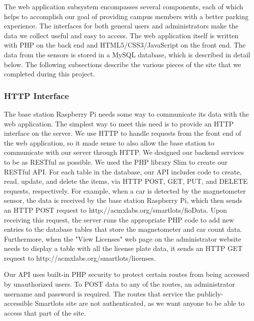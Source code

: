 \documentclass[11pt, oneside, fullpage, doublespace]{article}
\begin{document}
The web application subsystem encompasses several components, each of which helps to accomplish our goal of providing campus members with a better parking experience. The interfaces for both general users and administrators make the data we collect useful and easy to access. The web application itself is written with PHP on the back end and HTML5/CSS3/JavaScript on the front end. The data from the sensors is stored in a MySQL database, which is described in detail below. The following subsections describe the various pieces of the site that we completed during this project.

\subsubsection{HTTP Interface}
The base station Raspberry Pi needs some way to communicate its data with the web application. The simplest way to meet this need is to provide an HTTP interface on the server. We use HTTP to handle requests from the front end of the web application, so it made sense to also allow the base station to communicate with our server through HTTP. We designed our backend services to be as RESTful \cite{REST} as possible. We used the PHP library Slim \cite{Slim} to create our RESTful API. For each table in the database, our API includes code to create, read, update, and delete the items, via HTTP POST, GET, PUT, and DELETE requests, respectively. For example, when a car is detected by the magnetometer sensor, the data is received by the base station Raspberry Pi, which then sends an HTTP POST request to http://acmxlabs.org/smartlots/fioData. Upon receiving this request, the server runs the appropriate PHP code to add new entries to the database tables that store the magnetometer and car count data. Furthermore, when the "View Licenses" web page on the administrator website needs to display a table with all the license plate data, it sends an HTTP GET request to http://acmxlabs.org/smartlots/licenses.

Our API uses built-in PHP security to protect certain routes from being accessed by unauthorized users. To POST data to any of the routes, an administrator username and password is required. The routes that service the publicly-accessible Smartlots site are not authenticated, as we want anyone to be able to access that part of the site.
\end{document}
